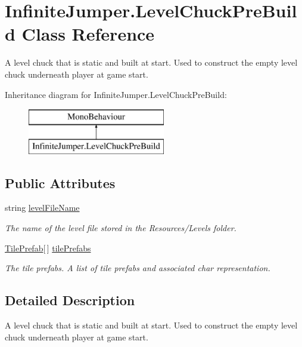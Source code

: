 \hypertarget{class_infinite_jumper_1_1_level_chuck_pre_build}{}\section{Infinite\+Jumper.\+Level\+Chuck\+Pre\+Build Class Reference}
\label{class_infinite_jumper_1_1_level_chuck_pre_build}


A level chuck that is static and built at start. Used to construct the empty level chuck underneath player at game start.  


Inheritance diagram for Infinite\+Jumper.\+Level\+Chuck\+Pre\+Build\+:\begin{figure}[H]
\begin{center}
\leavevmode
\includegraphics[height=2.000000cm]{class_infinite_jumper_1_1_level_chuck_pre_build}
\end{center}
\end{figure}
\subsection*{Public Attributes}
\begin{DoxyCompactItemize}
\item 
string \hyperlink{class_infinite_jumper_1_1_level_chuck_pre_build_a0f4f1321b1075afb43ecaf941661ccba}{level\+File\+Name}
\begin{DoxyCompactList}\small\item\em The name of the level file stored in the Resources/\+Levels folder. \end{DoxyCompactList}\item 
\hyperlink{class_infinite_jumper_1_1_tile_prefab}{Tile\+Prefab}\mbox{[}$\,$\mbox{]} \hyperlink{class_infinite_jumper_1_1_level_chuck_pre_build_a20f873ee6a33540ada00006fb3dae662}{tile\+Prefabs}
\begin{DoxyCompactList}\small\item\em The tile prefabs. A list of tile prefabs and associated char representation. \end{DoxyCompactList}\end{DoxyCompactItemize}


\subsection{Detailed Description}
A level chuck that is static and built at start. Used to construct the empty level chuck underneath player at game start. 



